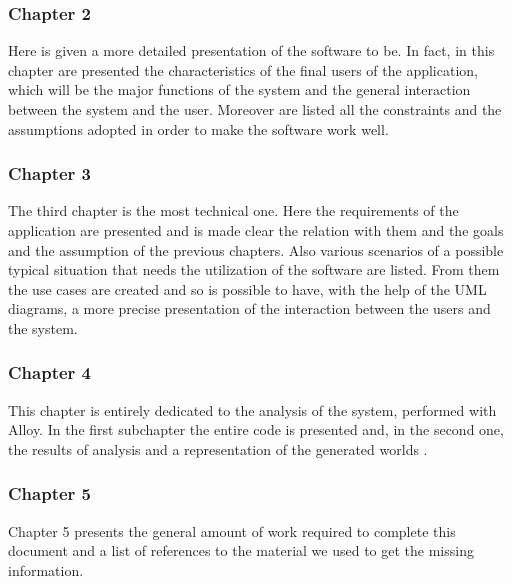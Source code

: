 \begin{flushleft}
{\color{Blue}\subsubsection{Chapter 2}}
Here is given a more detailed presentation of the software to be. In fact, in this chapter are presented the characteristics of the final users of the application, which will be the major functions of the system and the general interaction between the system and the user.
Moreover are listed all the constraints and the assumptions adopted in order to make the software work well.
\paragraph{}

{\color{Blue}\subsubsection{Chapter 3}}
The third chapter is the most technical one. Here the requirements of the application are presented and is made clear the relation with them and the goals and the assumption of the previous chapters. Also various scenarios of a possible typical situation that needs the utilization of the software are listed. From them the use cases are created and so is possible to have, with the help of the UML diagrams, a more precise presentation of the interaction between the users and the system.
\paragraph{}

{\color{Blue}\subsubsection{Chapter 4}}
This chapter is entirely dedicated to the analysis of the system, performed with Alloy. In the first subchapter the entire code is presented and, in the second one, the results of analysis and a representation of the generated worlds . \par
\paragraph{}

{\color{Blue}\subsubsection{Chapter 5}}
Chapter 5 presents the general amount of work required to complete this document and a list of references to the material we used to get the missing information.\par
\paragraph{}

\end{flushleft}